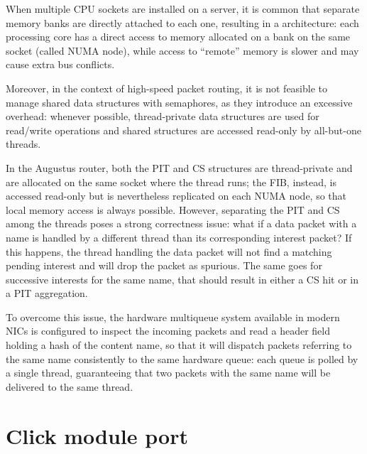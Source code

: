 \documentclass[11pt,a4paper,twoside,titlepage,openany]{book}
\begin{document}
When multiple CPU sockets are installed on a server, it is common that separate memory banks are directly attached to each one, resulting in a  architecture: each processing core has a direct access to memory allocated on a bank on the same socket (called NUMA node), while access to ``remote'' memory is slower and may cause extra bus conflicts.

Moreover, in the context of high-speed packet routing, it is not feasible to manage shared data structures with semaphores, as they introduce an excessive overhead: whenever possible, thread-private data structures are used for read/write operations and shared structures are accessed read-only by all-but-one threads.

In the Augustus router, both the \gls{PIT} and \gls{CS} structures are thread-private and are allocated on the same socket where the thread runs; the \gls{FIB}, instead, is accessed read-only but is nevertheless replicated on each NUMA node, so that local memory access is always possible.
However, separating the \gls{PIT} and \gls{CS} among the threads poses a strong correctness issue: what if a data packet with a name is handled by a different thread than its corresponding interest packet? If this happens, the thread handling the data packet will not find a matching pending interest and will drop the packet as spurious. The same goes for successive interests for the same name, that should result in either a CS hit or in a PIT aggregation.

To overcome this issue, the hardware multiqueue system available in modern NICs is configured to inspect the incoming packets and read a header field holding a hash of the content name, so that it will dispatch packets referring to the same name consistently to the same hardware queue: each queue is polled by a single thread, guaranteeing that two packets with the same name will be delivered to the same thread.

\section{Click module port}\label{sec:augustus.click}

\end{document}
